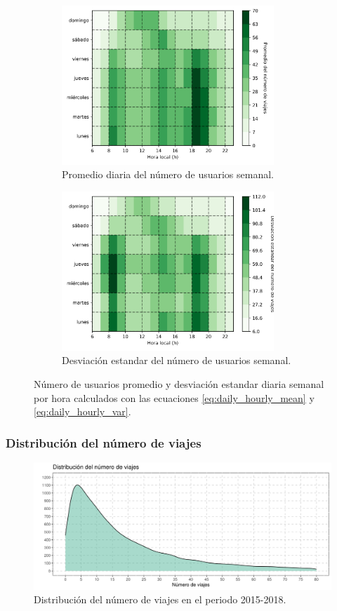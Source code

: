 \begin{figure}[H]
    \centering
    \begin{subfigure}[b]{8cm}
        \includegraphics[width=8cm]{Graphics/daily_hourly_mean_count_travel.png}
        \caption{Promedio diaria del número de usuarios semanal.}
        \label{fig:daily_hourly_mean_count_travel}
    \end{subfigure}
    \begin{subfigure}[b]{8cm}
        \includegraphics[width=8cm]{Graphics/daily_hourly_var_count_travel.png}
        \caption{Desviación estandar del número de usuarios semanal.}
        \label{fig:daily_hourly_var_count_travel}
    \end{subfigure}
    \caption{Número de usuarios promedio y desviación estandar diaria semanal por hora calculados con las ecuaciones \ref{eq:daily_hourly_mean} y \ref{eq:daily_hourly_var}.}
    \label{fig:daily_hourly_count_travel}
\end{figure}

\subsubsection{Distribución del número de viajes}

\begin{figure}[H]
    \centering
    \includegraphics[width=16cm]{Graphics/distribution_count_travel.png}
    \caption{Distribución del número de viajes en el periodo 2015-2018.}
    \label{fig:distribution_count_travel}
\end{figure}